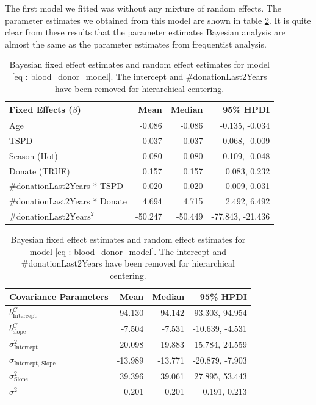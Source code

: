 The first model we fitted was without any mixture of random effects. The parameter estimates we obtained from this model are shown in table \ref{table : bayesian fixed effects}. It is quite clear from these results that the parameter estimates Bayesian analysis are almost the same as the parameter estimates from frequentist analysis.

\begin{table}[!htb]
\centering
\captionsetup{justification=centering}
\caption{Bayesian fixed effect estimates and random effect estimates for model \ref{eq : blood_donor_model}. The intercept and \#donationLast2Years have been removed for hierarchical centering.}
\label{table : bayesian fixed effects}
\begin{tabular}{@{}lrrr@{}}
\toprule
Fixed Effects ($\beta$) & Mean & Median & 95\% HPDI \\ \midrule
Age & -0.086 & -0.086 & -0.135, -0.034\\
TSPD & -0.037 & -0.037 & -0.068, -0.009 \\
Season (Hot) & -0.080 & -0.080 & -0.109, -0.048\\
Donate (TRUE) & 0.157 & 0.157 & 0.083, 0.232 \\
\#donationLast2Years * TSPD & 0.020 & 0.020 & 0.009, 0.031  \\
\#donationLast2Years * Donate & 4.694 & 4.715 & 2.492, 6.492 \\
$\text{\#donationLast2Years}^2$ & -50.247 & -50.449 & -77.843, -21.436 \\ \bottomrule
\end{tabular}

\begin{tabular}{@{}lrrr@{}}
\toprule
Covariance Parameters & Mean & Median & 95\% HPDI \\ \midrule
$b_{\text{Intercept}}^C$& 94.130 & 94.142 & 93.303, 94.954\\
$b_{\text{slope}}^C$ & -7.504 & -7.531 & -10.639, -4.531\\
$\sigma^2_\text{Intercept}$ & 20.098 & 19.883 & 15.784, 24.559\\
$\sigma_\text{Intercept, Slope}$ & -13.989 & -13.771 & -20.879, -7.903\\
$\sigma^2_\text{Slope}$ & 39.396 & 39.061 & 27.895, 53.443\\
$\sigma^2$ & 0.201 & 0.201 & 0.191, 0.213\\ \bottomrule
\end{tabular}
\end{table}

